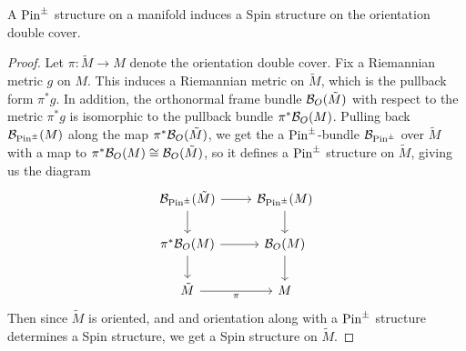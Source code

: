 %
\begin{thm}
A $\mathrm{Pin}^\pm$ structure on a manifold induces a Spin structure on the orientation
double cover.
\end{thm}
%
\begin{proof}
Let $ \pi : \tilde{M} \to M$ denote the orientation double cover. Fix a Riemannian
metric $g$ on $M$. This induces a Riemannian metric on $\tilde{M}$, which
is the pullback form $\pi^*g$. In addition, the orthonormal frame bundle
$\mathcal{B}_O(\tilde{M})$ with respect to the metric $\pi^*g$ is isomorphic to the
pullback bundle $\pi^*\mathcal{B}_O(M)$. Pulling back $\mathcal{B}_{\mathrm{Pin}^\pm}(M)$ along the map
$\pi^*\mathcal{B}_O(\tilde{M})$, we get the a $\mathrm{Pin}^\pm$-bundle $\mathcal{B}_{\mathrm{Pin}^\pm}$ over
$\tilde{M}$ with a map to $\pi^*\mathcal{B}_{O}(M) \cong \mathcal{B}_O(\tilde{M})$, so it defines
a $\mathrm{Pin}^\pm$ structure on $\tilde{M}$, giving us the diagram
\[\begin{tikzcd}
\B_{\Pin^\pm}(\tilde{M}) \ar[d]\ar[r] & \B_{\Pin^\pm}(M) \ar[d]\\
\pi^*\B_O(M) \ar[d]\ar[r] & \B_O(M) \ar[d]\\
\tilde{M} \ar[r, "\pi"'] & M
\end{tikzcd}\]
Then since $\tilde{M}$ is oriented, and and orientation along with a $\mathrm{Pin}^\pm$
structure determines a Spin structure, we get a Spin structure on $\tilde{M}$.
\end{proof}
%